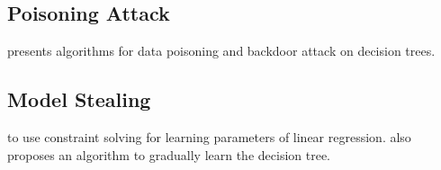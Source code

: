 

\subsection*{Poisoning Attack}  \cite{huang2020embedding} presents algorithms for data poisoning and backdoor attack on decision trees. 

\subsection*{Model Stealing}
\cite{DBLP:conf/sp/WangG18} to use constraint solving for learning parameters of linear regression. \cite{10.5555/3241094.3241142} also proposes an algorithm to gradually learn the decision tree. 